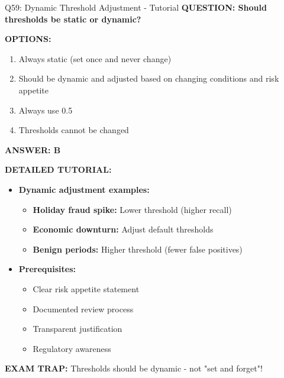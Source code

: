 \documentclass[8pt]{beamer}
\begin{document}
	\begin{frame}{Q59: Dynamic Threshold Adjustment - Tutorial}
		\fontsize{6.5}{7.5}\selectfont
		\textbf{QUESTION: Should thresholds be static or dynamic?}
		
		\vspace{0.1cm}
		\textbf{OPTIONS:}
		\begin{enumerate}
			\item Always static (set once and never change)
			\item Should be dynamic and adjusted based on changing conditions and risk appetite
			\item Always use 0.5
			\item Thresholds cannot be changed
		\end{enumerate}
		
		\vspace{0.1cm}
		\textcolor{myblue}{\textbf{ANSWER: B}}
		
		\vspace{0.1cm}
		\textbf{DETAILED TUTORIAL:}
		\begin{itemize}
			\item \textbf{Dynamic adjustment examples:}
			\begin{itemize}
				\item \textbf{Holiday fraud spike:} Lower threshold (higher recall)
				\item \textbf{Economic downturn:} Adjust default thresholds
				\item \textbf{Benign periods:} Higher threshold (fewer false positives)
			\end{itemize}
			\item \textbf{Prerequisites:}
			\begin{itemize}
				\item Clear risk appetite statement
				\item Documented review process
				\item Transparent justification
				\item Regulatory awareness
			\end{itemize}
		\end{itemize}
		
		\textcolor{myred}{\textbf{EXAM TRAP:}} Thresholds should be \textcolor{myblue}{dynamic} - not "set and forget"!
	\end{frame}
	
\end{document}
